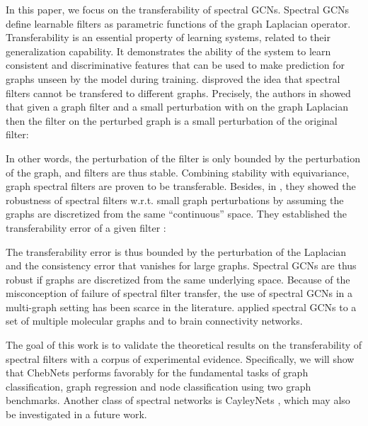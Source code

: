 \documentclass[letterpaper]{article} \usepackage{aaai21}  \usepackage{times}  \usepackage{helvet} \usepackage{courier}  \usepackage[hyphens]{url}  \usepackage{graphicx} \usepackage{natbib}  \usepackage{caption} \frenchspacing  \setlength{\pdfpagewidth}{8.5in}  \setlength{\pdfpageheight}{11in}
\begin{document}
In this paper, we focus on the transferability of spectral GCNs. Spectral GCNs define learnable filters as parametric functions of the graph Laplacian operator.
Transferability is an essential property of learning systems, related to their generalization capability. It demonstrates the ability of the system to learn consistent and discriminative features that can be used to make prediction for graphs unseen by the model during training.
\cite{levie_transferability_2019,levie_transferability_2019-1} disproved the idea that spectral filters cannot be transfered to different graphs. Precisely, the authors in \cite{levie_transferability_2019} showed that given a graph filter  and a small perturbation  with  on the graph Laplacian  then the filter on the perturbed graph is a small perturbation of the original filter:


In other words, the perturbation of the filter is only bounded by the perturbation of the graph, and filters are thus stable. Combining stability with equivariance, graph spectral filters are proven to be transferable.
Besides, in \cite{levie_transferability_2019-1}, they showed the robustness of spectral filters w.r.t. small graph perturbations by assuming the graphs are discretized from the same “continuous” space. They established the transferability error of a given filter :


The transferability error is thus bounded by the perturbation of the Laplacian  and the consistency error that vanishes for large graphs. Spectral GCNs are thus robust if graphs are discretized from the same underlying space.
Because of the misconception of failure of spectral filter transfer, the use of spectral GCNs in a multi-graph setting has been scarce in the literature. \cite{knyazev_spectral_2018} applied spectral GCNs to a set of multiple molecular graphs and \cite{ktena2018metric} to brain connectivity networks.

The goal of this work is to validate the theoretical results on the transferability of spectral filters with a corpus of experimental evidence. Specifically, we will show that ChebNets \cite{defferrard_convolutional_nodate} performs favorably for the fundamental tasks of graph classification, graph regression and node classification using two graph benchmarks. Another  class of spectral networks is CayleyNets \cite{levie2018cayleynets}, which may also be investigated in a future work.
\end{document}
